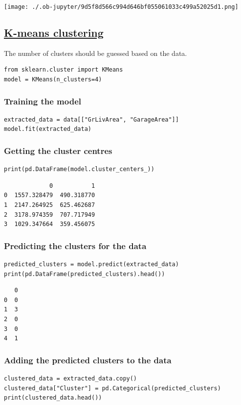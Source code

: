 \documentclass[11pt]{article}
\begin{document}
\begin{center}
\texttt{[image: ./.ob-jupyter/9d5f8d566c994d646bf055061033c499a52025d1.png]}
\label{org8c10660}
\end{center}
\subsection{\href{https://scikit-learn.org/stable/modules/generated/sklearn.cluster.KMeans.html}{K-means clustering}}
\label{sec:org4d2104f}
The number of clusters should be guessed based on the data.
\begin{verbatim}
from sklearn.cluster import KMeans
model = KMeans(n_clusters=4)
\end{verbatim}
\subsubsection{Training the model}
\label{sec:orgc82b112}
\begin{verbatim}
extracted_data = data[["GrLivArea", "GarageArea"]]
model.fit(extracted_data)
\end{verbatim}
\subsubsection{Getting the cluster centres}
\label{sec:org4a9b915}
\begin{verbatim}
print(pd.DataFrame(model.cluster_centers_))
\end{verbatim}

\label{org4348bcd}
\begin{verbatim}
             0           1
0  1557.328479  490.318770
1  2147.264925  625.462687
2  3178.974359  707.717949
3  1029.347664  359.456075
\end{verbatim}
\subsubsection{Predicting the clusters for the data}
\label{sec:org2671b66}
\begin{verbatim}
predicted_clusters = model.predict(extracted_data)
print(pd.DataFrame(predicted_clusters).head())
\end{verbatim}

\label{org075b61c}
\begin{verbatim}
   0
0  0
1  3
2  0
3  0
4  1
\end{verbatim}
\subsubsection{Adding the predicted clusters to the data}
\label{sec:org12e4d1c}
\begin{verbatim}
clustered_data = extracted_data.copy()
clustered_data["Cluster"] = pd.Categorical(predicted_clusters)
print(clustered_data.head())
\end{verbatim}
\end{document}
